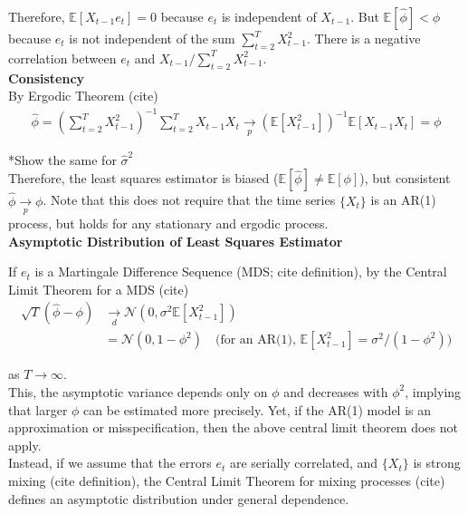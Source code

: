 \documentclass[latex/main.tex]{subfiles}
\begin{document}
Therefore, $\mathbb{E}[X_{t-1}e_t] = 0$ because $e_t$ is independent of $X_{t-1}$. But $\mathbb{E}[\hat \phi] < \phi$ because $e_t$ is not independent of the sum $\sum_{t=2}^T X_{t-1}^2$. There is a negative correlation between $e_t$ and $X_{t-1}/\sum_{t=2}^T X_{t-1}^2$.\\

\textbf{Consistency}\\

By Ergodic Theorem (cite)
\begin{align*}
    \hat\phi = (\sum_{t=2}^T X_{t-1}^2)^{-1} \sum_{t=2}^T X_{t-1} X_t \underset{p}{\to}
    (\mathbb{E}[X_{t-1}^2])^{-1} \mathbb{E}[X_{t-1} X_t] = \phi
\end{align*}

*Show the same for $\hat \sigma^2$\\

Therefore, the least squares estimator is biased ($\mathbb{E}[\hat\phi] \ne \mathbb{E}[\phi]$), but consistent $\hat \phi \underset{p}{\to} \phi$. Note that this does not require that the time series $\{X_t\}$ is an AR(1) process, but holds for any stationary and ergodic process.\\


\textbf{Asymptotic Distribution of Least Squares Estimator}

If $e_t$ is a Martingale Difference Sequence (MDS; cite definition), by the Central Limit Theorem for a MDS (cite)
\begin{align*}
    \sqrt{T}(\hat \phi - \phi) &\underset{d}{\to} \mathcal{N}(0, \sigma^2 \mathbb{E}[X_{t-1}^2])\\
    &= \mathcal{N}(0, 1- \phi^2) \quad (\text{for an AR(1), $\mathbb{E}[X_{t-1}^2] = \sigma^2 / (1-\phi^2)$)}
\end{align*}

as $T \to \infty$.\\

This, the asymptotic variance depends only on $\phi$ and decreases with $\phi^2$, implying that larger $\phi$ can be estimated more precisely. Yet, if the AR(1) model is an approximation or misspecification, then the above central limit theorem does not apply. \\

Instead, if we assume that the errors $e_t$ are serially correlated, and $\{X_t\}$ is strong mixing (cite definition), the Central Limit Theorem for mixing processes (cite) defines an asymptotic distribution under general dependence.
\end{document}
